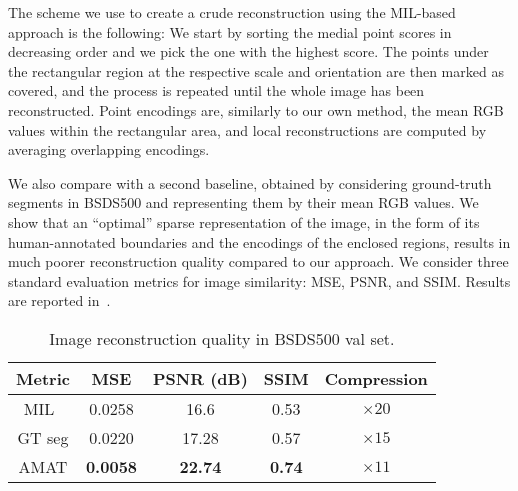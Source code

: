 \documentclass[10pt,twocolumn,letterpaper]{article}
\begin{document}
The scheme we use to create a crude reconstruction using the MIL-based approach is the following:
We start by sorting the medial point scores in decreasing order and we pick the one with the highest score.
The points under the rectangular region at the respective scale and orientation are then marked as covered,
and the process is repeated until the whole image has been reconstructed.
Point encodings are, similarly to our own method, the mean RGB values within the rectangular area, 
and local reconstructions are computed by averaging overlapping encodings.

We also compare with a second baseline, obtained by considering ground-truth segments in BSDS500
and representing them by their mean RGB values.
We show that an ``optimal'' sparse representation of the image, in the form of its human-annotated
boundaries and the encodings of the enclosed regions, results in much poorer reconstruction
quality compared to our approach.
We consider three standard evaluation metrics for image similarity: MSE, PSNR, and SSIM.
Results are reported in~.


\begin{table}
\centering
\begin{tabular}{|c|c|c|c|c|}
\hline
Metric	&	MSE		&	PSNR (dB)	&	SSIM	&	Compression 	\\
\hline
MIL~\cite{tsogkas2012learning}	&	0.0258	& 	16.6 	& 	0.53	&	$\times20$	\\
\hline
GT seg &	0.0220	& 	17.28 	& 	0.57	&	$\times15$\\
\hline
AMAT	&	\textbf{0.0058}	&	\textbf{22.74}	&	\textbf{0.74}	&	$\times11$	\\
\hline
\end{tabular}
\caption{Image reconstruction quality in BSDS500 val set.}
\label{tab:experiments:reconstruction}
\end{table}
\end{document}
